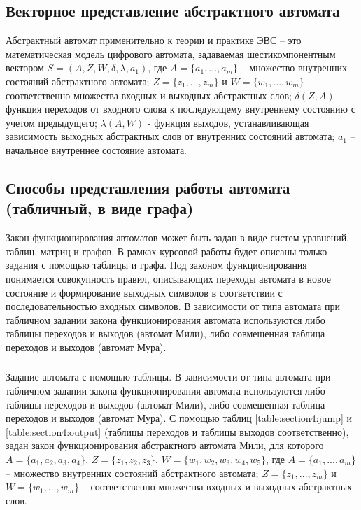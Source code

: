 \subsection{Векторное представление абстрактного автомата}

Абстрактный автомат применительно к теории и практике ЭВС – это математическая модель цифрового автомата, задаваемая шестикомпонентным вектором $S=(A,Z,W,\delta,\lambda,a_1)$, где $A=\lbrace a_1 ,..., a_m \rbrace$ – множество внутренних состояний абстрактного автомата; $Z=\lbrace z_1 ,..., z_m \rbrace$ и $W =\lbrace w_1 ,... ,w_m \rbrace$ – соответственно множества входных и выходных абстрактных слов; $\delta (Z, A)$ - функция переходов от входного слова к последующему внутреннему состоянию с учетом предыдущего; $\lambda (A, W)$ - функция выходов, устанавливающая зависимость выходных абстрактных слов от внутренних состояний автомата; $a_1$ – начальное внутреннее состояние автомата.

\subsection{Способы представления работы автомата (табличный, в виде графа)}

Закон функционирования автоматов может быть задан в виде систем уравнений, таблиц, матриц и графов. В рамках курсовой работы будет описаны только задания с помощью таблицы и графа. Под законом функционирования понимается совокупность правил, описывающих переходы автомата в новое состояние и формирование выходных символов в соответствии с последовательностью входных символов. В зависимости от типа автомата при табличном задании закона функционирования автомата используются либо таблицы переходов и выходов (автомат Мили), либо совмещенная таблица переходов и выходов (автомат Мура).

\subsubsection{}
Задание автомата с помощью таблицы. 
В зависимости от типа автомата при табличном задании закона функционирования автомата используются либо таблицы переходов и выходов (автомат Мили), либо совмещенная таблица переходов и выходов (автомат Мура). С помощью таблиц \ref{table:section4:jump} и \ref{table:section4:output} (таблицы переходов и таблицы выходов соответственно), задан закон функционирования абстрактного автомата Мили, для которого $A=\lbrace a_1,a_2,a_3,a_4\rbrace$, $Z=\lbrace z_1,z_2,z_3\rbrace$,  $W=\lbrace w_1,w_2,w_3,w_4,w_5\rbrace$, где $A=\lbrace a_1 ,..., a_m \rbrace$ – множество внутренних состояний абстрактного автомата; $Z=\lbrace z_1 ,..., z_m\rbrace$ и $W =\lbrace w_1 ,... ,w_m \rbrace$ – соответственно множества входных и выходных абстрактных слов.

